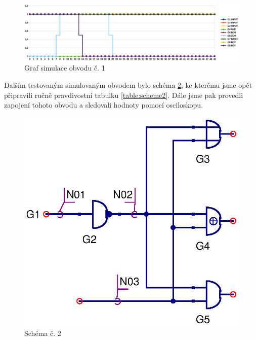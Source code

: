 \documentclass[11pt,a4paper]{article}
\begin{document}
		\begin{figure}[!htb]
				\centering
					\includegraphics[scale=.5]{graf1.eps}
					\caption{Graf simulace obvodu č. 1}
					\label{fig:graf1}
			\end{figure}

		Dalším testovaným simulovaným obvodem bylo schéma \ref{fig:scheme2}, ke kterému jsme opět připravili ručně pravdivostní tabulku \ref{table:scheme2}. Dále jsme pak provedli zapojení tohoto obvodu a sledovali hodnoty pomocí osciloskopu.

		\begin{figure}[!htb]
				\centering
					\includegraphics[scale=.7]{input2.eps}
					\caption{Schéma č. 2}
					\label{fig:scheme2}
			\end{figure}
\end{document}
